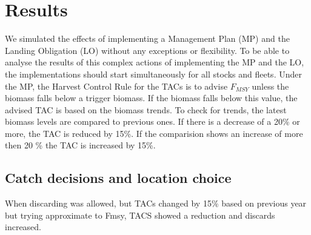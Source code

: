 \documentclass[12pt,oneline,a4paper,numbib]{ouparticle}
\numberwithin{equation}{subsection} %
\begin{document}
        
        




\section{Results}
\label{sec3}

We simulated the effects of implementing a Management Plan (MP) and the Landing Obligation (LO) without any exceptions or flexibility. To be able to analyse the results of this complex actions of implementing the MP and the LO, the implementations should start simultaneously for all stocks and fleets. Under the MP, the Harvest Control Rule for the TACs is to advise $F_{MSY}$ unless the biomass falls below a trigger biomass. If the biomass falls below this value, the advised TAC is based on the biomass trends. To check for trends, the latest biomass levels are compared to previous ones. If there is a decrease of a 20\% or more, the TAC is reduced by 15\%. If the comparision shows an increase of more then 20 \% the TAC is increased by 15\%.

\subsection{Catch decisions and location choice}
\label{sec3.1}
When discarding was allowed, but TACs changed by 15\% based on previous year but trying approximate to Fmsy, TACS showed a reduction and discards increased. 
\end{document}
